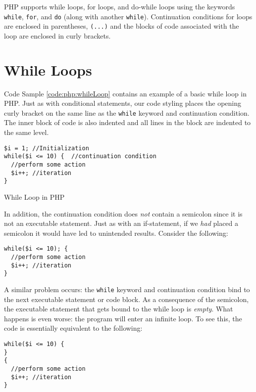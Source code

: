 

PHP supports while loops, for loops, and do-while loops using the keywords
\texttt{while}, \texttt{for}, and \texttt{do} (along with 
another \texttt{while}).  Continuation conditions for loops are 
enclosed in parentheses, \texttt{(...)} and the blocks of code
associated with the loop are enclosed in curly brackets.  

\section{While Loops}

Code Sample \ref{code:php:whileLoop} contains an example of a basic
while loop in PHP.  Just as with conditional statements, our code styling
places the opening curly bracket on the same line as the \texttt{while}
keyword and continuation condition.  The inner block of code is also
indented and all lines in the block are indented to the same level.

\begin{listing}
\begin{verbatim}
$i = 1; //Initialization
while($i <= 10) {  //continuation condition
  //perform some action
  $i++; //iteration
}
\end{verbatim}
  \caption{While Loop in PHP}
  \label{code:php:whileLoop}
\end{listing}

In addition, the continuation condition does \emph{not} contain 
a semicolon since it is not an executable statement.  Just as with
an if-statement, if we \emph{had} placed a semicolon it would 
have led to unintended results.  Consider the following:

\begin{verbatim}
while($i <= 10); {
  //perform some action
  $i++; //iteration
}
\end{verbatim}

A similar problem occurs: the \texttt{while} keyword and
continuation condition bind to the next executable statement or
code block.  As a consequence of the semicolon, the executable
statement that gets bound to the while loop is \emph{empty}.  What
happens is even worse: the program will enter an infinite loop.  To
see this, the code is essentially equivalent to the following:

\begin{verbatim}
while($i <= 10) {
}
{
  //perform some action
  $i++; //iteration
}
\end{verbatim}

